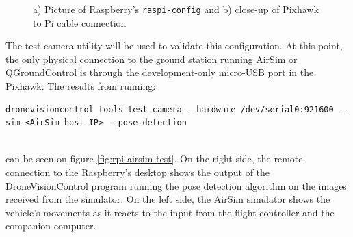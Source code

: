 \begin{figure}
  \centering
  \caption{a) Picture of Raspberry's \texttt{raspi-config} and b) close-up of Pixhawk to Pi cable connection}
  \label{fig:serial-connection}
\end{figure}

The test camera utility will be used to validate this configuration.
At this point, the only physical connection to the ground station running AirSim or QGroundControl is through the development-only micro-USB port in the Pixhawk.
The results from running: \\
\begin{listing}[h!]
    \begin{verbatim}
dronevisioncontrol tools test-camera --hardware /dev/serial0:921600 --sim <AirSim host IP> --pose-detection
    \end{verbatim}
\end{listing}\\
can be seen on figure \ref{fig:rpi-airsim-test}.
On the right side, the remote connection to the Raspberry's desktop shows the output of the DroneVisionControl program running the pose detection algorithm on the images received from the simulator.
On the left side, the AirSim simulator shows the vehicle's movements as it reacts to the input from the flight controller and the companion computer.

